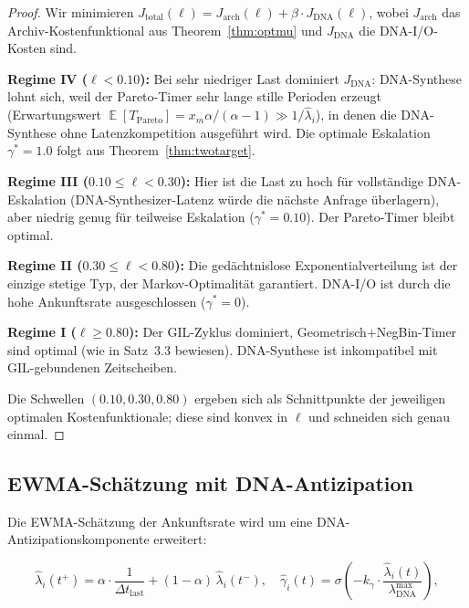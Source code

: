 ﻿\documentclass[a4paper,12pt]{article}
\theoremstyle{definition}
\DeclareMathOperator{\E}{\mathbb{E}}
\newcommand{\Pareto}{\mathrm{Pareto}}
\begin{document}
\begin{proof}
  Wir minimieren $J_{\mathrm{total}}(\ell) = J_{\mathrm{arch}}(\ell)
  + \beta \cdot J_{\mathrm{DNA}}(\ell)$, wobei
  $J_{\mathrm{arch}}$ das Archiv-Kosten\-funktional aus Theorem~\ref{thm:optmu}
  und $J_{\mathrm{DNA}}$ die DNA-I/O-Kosten sind.

  \textbf{Regime IV ($\ell < 0.10$):} Bei sehr niedriger Last
  dominiert $J_{\mathrm{DNA}}$: DNA-Synthese lohnt sich, weil der
  Pareto-Timer sehr lange stille Perioden erzeugt (Erwartungswert
  $\E[T_\Pareto] = x_m \alpha /(\alpha - 1) \gg 1/\hat\lambda_i$),
  in denen die DNA-Synthese ohne Latenzkompetition ausgeführt wird.
  Die optimale Eskalation $\gamma^* = 1.0$ folgt aus Theorem~\ref{thm:twotarget}.

  \textbf{Regime III ($0.10 \le \ell < 0.30$):} Hier ist die Last zu hoch
  für vollständige DNA-Eskalation (DNA-Synthesizer-Latenz würde die
  nächste Anfrage überlagern), aber niedrig genug für teilweise Eskalation
  ($\gamma^* = 0.10$). Der Pareto-Timer bleibt optimal.

  \textbf{Regime II ($0.30 \le \ell < 0.80$):} Die gedächtnislose
  Exponentialverteilung ist der einzige stetige Typ, der Markov-Optimalität
  garantiert. DNA-I/O ist durch die hohe Ankunftsrate ausgeschlossen
  ($\gamma^* = 0$).

  \textbf{Regime I ($\ell \ge 0.80$):} Der GIL-Zyklus dominiert,
  Geometrisch+NegBin-Timer sind optimal (wie in \cite{epp2026pymca8}
  Satz~3.3 bewiesen). DNA-Synthese ist inkompatibel mit GIL-gebundenen
  Zeitscheiben.

  Die Schwellen $(0.10, 0.30, 0.80)$ ergeben sich als Schnittpunkte
  der jeweiligen optimalen Kostenfunktionale; diese sind konvex in $\ell$
  und schneiden sich genau einmal.
\end{proof}

\subsection{EWMA-Schätzung mit DNA-Antizipation}

Die EWMA-Schätzung der Ankunftsrate wird um eine DNA-Antizipationskomponente
erweitert:

\begin{equation}
  \hat\lambda_i(t^+) = \alpha \cdot \frac{1}{\Delta t_{\mathrm{last}}}
  + (1-\alpha)\,\hat\lambda_i(t^-),
  \quad
  \hat\gamma_i(t) = \sigma\!\left(-k_\gamma \cdot
  \frac{\hat\lambda_i(t)}{\lambda_{\mathrm{DNA}}^{\mathrm{max}}}\right),
  \label{eq:ewma_dna}
\end{equation}
\end{document}
